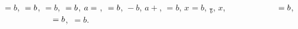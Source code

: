 \documentclass{article}
\begin{document}
$\mbox{}=b$, $\hbox{}=b$, $\text{}=b$, $\strut=b$, $a=\strut$, $\makebox[0pt]{}=b$, $\mbox{}-b$, $a+\mbox{}$,
$\mbox{}\mbox{}=b$, $x^{\mbox{}}=b$, $\frac{\mbox{}}{b}$, $\mbox{}x$,
$\mbox{\makebox[1cm]{}\makebox[1cm]{}}=b$, $\raisebox{1ex}{\makebox[1cm]{}\makebox[1cm]{}}=b$, $\mbox{}\,=b$.
\end{document}
